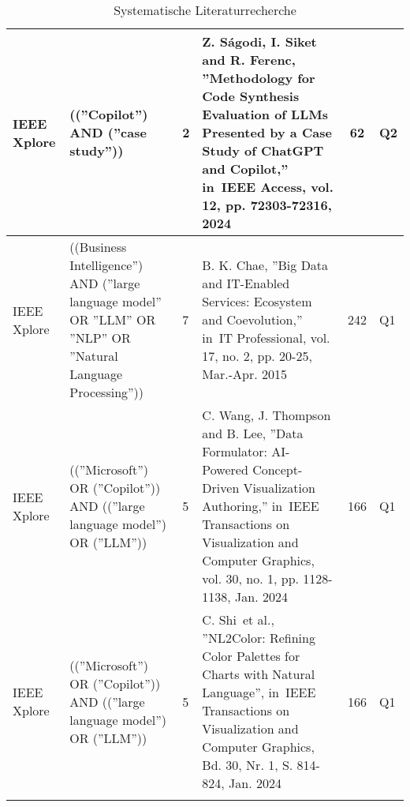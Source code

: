 \begin{scriptsize}
\begin{longtable}{|p{1cm}|p{3cm}|C{1.1cm}|p{4cm}|c|C{1.2cm}|}
    \hline
    IEEE Xplore & ((''Copilot'') AND (''case study'')) & 2 & Z. Ságodi, I. Siket and R. Ferenc, ''Methodology for Code Synthesis Evaluation of LLMs Presented by a Case Study of ChatGPT and Copilot,'' in IEEE Access, vol. 12, pp. 72303-72316, 2024 & 62 & Q2 \\
    \hline
    IEEE Xplore & ((Business Intelligence'') AND (''large language model'' OR ''LLM'' OR ''NLP'' OR ''Natural Language Processing'')) & 7 & B. K. Chae, ''Big Data and IT-Enabled Services: Ecosystem and Coevolution,'' in IT Professional, vol. 17, no. 2, pp. 20-25, Mar.-Apr. 2015 & 242 & Q1 \\
    \hline
    IEEE Xplore & ((''Microsoft'') OR (''Copilot'')) AND ((''large language model'') OR (''LLM'')) & 5 & C. Wang, J. Thompson and B. Lee, ''Data Formulator: AI-Powered Concept-Driven Visualization Authoring,'' in IEEE Transactions on Visualization and Computer Graphics, vol. 30, no. 1, pp. 1128-1138, Jan. 2024 & 166 & Q1 \\
    \hline
    IEEE Xplore & ((''Microsoft'') OR (''Copilot'')) AND ((''large language model'') OR (''LLM'')) & 5 & C. Shi et al., ''NL2Color: Refining Color Palettes for Charts with Natural Language'', in IEEE Transactions on Visualization and Computer Graphics, Bd. 30, Nr. 1, S. 814-824, Jan. 2024 & 166 & Q1 \\
    \hline
    \caption{Systematische Literaturrecherche}
    \label{table:search_results}
\end{longtable}
\end{scriptsize}

\clearpage